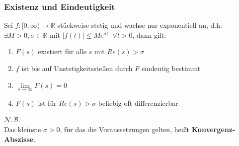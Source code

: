 \documentclass[a4paper,twocolumn,10pt]{article}
\begin{document}
\subsubsection{Existenz und Eindeutigkeit}
Sei $f:[0,\infty)\rightarrow\mathbb{R}$ stückweise stetig und wachse nur exponentiell an, d.h. $\exists M>0,\sigma\in\mathbb{R}$ mit $|f(t)|\leq Me^{\sigma t}\;\;\forall t>0$, dann gilt:
\begin{enumerate}[label=$\bullet$]
\item $F(s)$ existiert für alle $s$ mit $Re(s)>\sigma$
\item $f$ ist bis auf Unstetigkeitsstellen durch $F$ eindeutig bestimmt
\item $\lim\limits_{s\rightarrow\infty}F(s)=0$
\item $F(s)$ ist für $Re(s)>\sigma$ beliebig oft differenzierbar
\end{enumerate}
\underline{$\mathcal{N.B.}$}\\
Das kleinste $\sigma>0$, für das die Voraussetzungen gelten, heißt \textbf{Konvergenz-Abszisse}.
\end{document}
